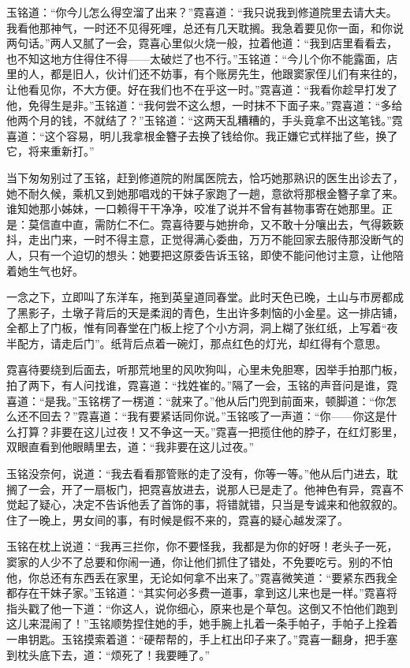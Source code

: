 \par 玉铭道：“你今儿怎么得空溜了出来？”霓喜道：“我只说我到修道院里去请大夫。我看他那神气，一时还不见得死哩，总还有几天耽搁。我急着要见你一面，和你说两句话。”两人又腻了一会，霓喜心里似火烧一般，拉着他道：“我到店里看看去，也不知这地方住得住不得——太破烂了也不行。”玉铭道：“今儿个你不能露面，店里的人，都是旧人，伙计们还不妨事，有个账房先生，他跟窦家侄儿们有来往的，让他看见你，不大方便。好在我们也不在乎这一时。”霓喜道：“我看你趁早打发了他，免得生是非。”玉铭道：“我何尝不这么想，一时抹不下面子来。”霓喜道：“多给他两个月的钱，不就结了？”玉铭道：“这两天乱糟糟的，手头竟拿不出这笔钱。”霓喜道：“这个容易，明儿我拿根金簪子去换了钱给你。我正嫌它式样拙了些，换了它，将来重新打。”
\par 当下匆匆别过了玉铭，赶到修道院的附属医院去，恰巧她那熟识的医生出诊去了，她不耐久候，乘机又到她那唱戏的干妹子家跑了一趟，意欲将那根金簪子拿了来。谁知她那小姊妹，一口赖得干干净净，咬准了说并不曾有甚物事寄在她那里。正是：莫信直中直，需防仁不仁。霓喜待要与她拚命，又不敢十分嚷出去，气得簌簌抖，走出门来，一时不得主意，正觉得满心委曲，万万不能回家去服侍那没断气的人，只有一个迫切的想头：她要把这原委告诉玉铭，即使不能问他讨主意，让他陪着她生气也好。
\par 一念之下，立即叫了东洋车，拖到英皇道同春堂。此时天色已晚，土山与市房都成了黑影子，土墩子背后的天是柔润的青色，生出许多刺恼的小金星。这一排店铺，全都上了门板，惟有同春堂在门板上挖了个小方洞，洞上糊了张红纸，上写着“夜半配方，请走后门”。纸背后点着一碗灯，那点红色的灯光，却红得有个意思。
\par 霓喜待要绕到后面去，听那荒地里的风吹狗叫，心里未免胆寒，因举手拍那门板，拍了两下，有人问找谁，霓喜道：“找姓崔的。”隔了一会，玉铭的声音问是谁，霓喜道：“是我。”玉铭楞了一楞道：“就来了。”他从后门兜到前面来，顿脚道：“你怎么还不回去？”霓喜道：“我有要紧话同你说。”玉铭咳了一声道：“你——你这是什么打算？非要在这儿过夜！又不争这一天。”霓喜一把揽住他的脖子，在红灯影里，双眼直看到他眼睛里去，道：“我非要在这儿过夜。”
\par 玉铭没奈何，说道：“我去看看那管账的走了没有，你等一等。”他从后门进去，耽搁了一会，开了一扇板门，把霓喜放进去，说那人已是走了。他神色有异，霓喜不觉起了疑心，决定不告诉他丢了首饰的事，将错就错，只当是专诚来和他叙叙的。住了一晚上，男女间的事，有时候是假不来的，霓喜的疑心越发深了。
\par 玉铭在枕上说道：“我再三拦你，你不要怪我，我都是为你的好呀！老头子一死，窦家的人少不了总要和你闹一通，你让他们抓住了错处，不免要吃亏。别的不怕他，你总还有东西丢在家里，无论如何拿不出来了。”霓喜微笑道：“要紧东西我全都存在干妹子家。”玉铭道：“其实何必多费一道事，拿到这儿来也是一样。”霓喜将指头戳了他一下道：“你这人，说你细心，原来也是个草包。这倒又不怕他们跑到这儿来混闹了！”玉铭顺势捏住她的手，她手腕上扎着一条手帕子，手帕子上拴着一串钥匙。玉铭摸索着道：“硬帮帮的，手上杠出印子来了。”霓喜一翻身，把手塞到枕头底下去，道：“烦死了！我要睡了。”
